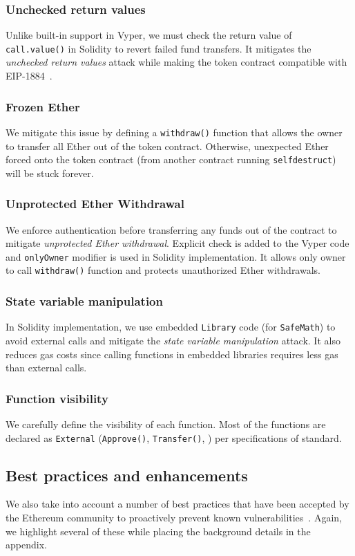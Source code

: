 \subsubsection{Unchecked return values}
Unlike built-in support in Vyper, we must check the return value of \texttt{call.value()} in Solidity to revert failed fund transfers. It mitigates the \textit{unchecked return values} attack while making the token contract compatible with EIP-1884~\cite{EIP1884}. 

\subsubsection{Frozen Ether}
We mitigate this issue by defining a \texttt{withdraw()} function that allows the owner to transfer all Ether out of the token contract. Otherwise, unexpected Ether forced onto the token contract (\eg from another contract running \texttt{selfdestruct}) will be stuck forever. 

\subsubsection{Unprotected Ether Withdrawal}
We enforce authentication before transferring any funds out of the contract to mitigate \textit{unprotected Ether withdrawal}. Explicit check is added to the Vyper code and \texttt{onlyOwner} modifier is used in Solidity implementation. It allows only owner to call \texttt{withdraw()} function and protects unauthorized Ether withdrawals. 

\subsubsection{State variable manipulation}
In Solidity implementation, we use embedded \texttt{Library} code (for \texttt{SafeMath}) to avoid external calls and mitigate the \textit{state variable manipulation} attack. It also reduces gas costs since calling functions in embedded libraries requires less gas than external calls.
	
\subsubsection{Function visibility} We carefully define the visibility of each function. Most of the functions are declared as \texttt{External} (\eg \texttt{Approve()}, \texttt{Transfer()}, \etc) per specifications of \erc standard.

\subsection{Best practices and enhancements}
We also take into account a number of best practices that have been accepted by the Ethereum community to proactively prevent known vulnerabilities~\cite{TokenBP}. Again, we highlight several of these while placing the background details in the appendix.

